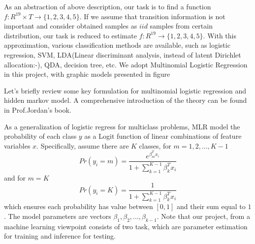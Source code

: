 As an abstraction of above description, our task is to find a function $f: R^{19}\times T \rightarrow \{1,2,3,4,5\}$. If we assume that transition information is not important and consider obtained samples as $iid$ samples from certain distribution, our task is reduced to estimate $f: R^{19} \rightarrow \{1,2,3,4,5\}$. With this approximation, various classification methods are available, such as logistic regression, SVM, LDA(Linear discriminant analysis, instead of latent Dirichlet allocation:-), QDA, decision tree, etc. We adopt Multinomial Logistic Regression in this project, with graphic models presented in figure %


Let's briefly review some key formulation for multinomial logistic regression and hidden markov model. A comprehensive introduction of the theory can be found in Prof.Jordan's book. 

As a generalization of logistic regress for multiclass problems, MLR model the probability of each class $y$ as a Logit function of linear combinations of feature variables $x$. Specifically, assume there are $K$ classes, for $m=1,2,...,K-1$
\begin{equation}
Pr(y_i=m) = \frac{e^{\beta_m^Tx_i}}{1+\sum_{k=1}^{K-1}\beta_k^Tx_i}
\end{equation}
and for $m=K$
\begin{equation}
Pr(y_i=K) = \frac{1}{1+\sum_{k=1}^{K-1}\beta_k^Tx_i}
\end{equation}
which ensures each probability has value between $[0,1]$ and their sum equal to $1$. The model parameters are vectors $\beta_1,\beta_2,...,\beta_{k-1}$. Note that our project, from a machine learning viewpoint consists of two task, which are parameter estimation for training and inference for testing. 

